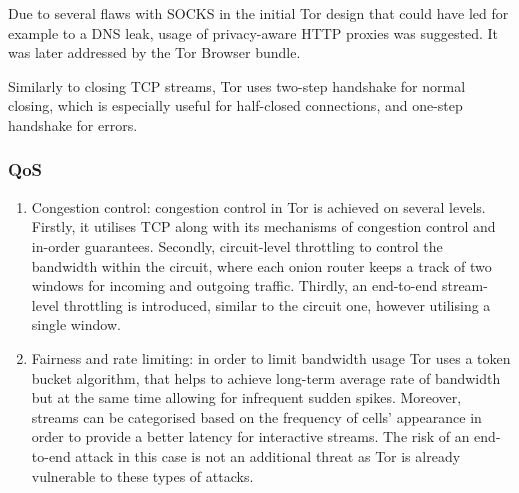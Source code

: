 Due to several flaws with SOCKS in the initial Tor design that could have led for example to a DNS leak, usage of privacy-aware HTTP proxies was suggested. It was later addressed by the Tor Browser bundle.

Similarly to closing TCP streams, Tor uses two-step handshake for normal closing, which is especially useful for half-closed connections, and one-step handshake for errors.

\subsubsection{QoS}
\begin{enumerate}
    \item Congestion control: congestion control in Tor is achieved on several levels. Firstly, it utilises TCP along with its mechanisms of congestion control and in-order guarantees. Secondly, circuit-level throttling to control the bandwidth within the circuit, where each onion router keeps a track of two windows for incoming and outgoing traffic. Thirdly, an end-to-end stream-level throttling is introduced, similar to the circuit one, however utilising a single window.
    \item Fairness and rate limiting: in order to limit bandwidth usage Tor uses a token bucket algorithm, that helps to achieve long-term average rate of bandwidth but at the same time allowing for infrequent sudden spikes.
    Moreover, streams can be categorised based on the frequency of cells' appearance in order to provide a better latency for interactive streams. The risk of an end-to-end attack in this case is not an additional threat as Tor is already vulnerable to these types of attacks.
\end{enumerate}

